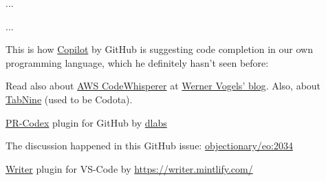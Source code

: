 \documentclass{article}
\begin{document}

...

\plush{}


...

\plush{}



This is how \href{https://github.com/features/copilot}{Copilot} by GitHub is suggesting code completion in our own programming language,
which he definitely hasn't seen before:

\begin{multicols}{4}
\end{multicols}

Read also about \href{https://aws.amazon.com/codewhisperer/}{AWS CodeWhisperer} at \href{https://www.allthingsdistributed.com/2023/04/how-ai-coding-companions-will-change-the-way-developers-work.html}{Werner Vogels' blog}. Also, about \href{https://github.com/codota}{TabNine} (used to be Codota).

\plush{}



\href{https://github.com/decentralizedlabs/pr-codex}{PR-Codex} plugin for GitHub by \href{https://www.dlabs.app/}{dlabs}

\plush{}



The discussion happened in this GitHub issue: \href{https://github.com/objectionary/eo/pull/2034}{objectionary/eo:2034}

\plush{}



\plush{}



\href{https://github.com/mintlify/writer}{Writer} plugin for VS-Code by \href{Mintlify}{https://writer.mintlify.com/}

\plush{}
\end{document}
